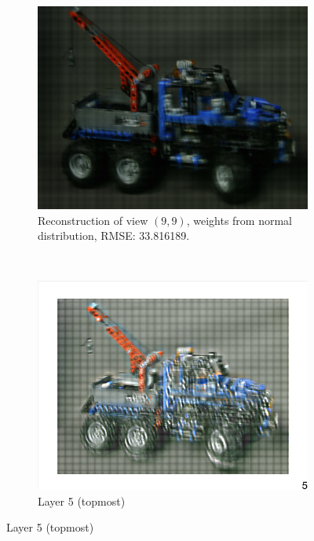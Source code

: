 \documentclass[11pt,a4paper,titlepage]{article}
\begin{document}
\begin{figure}
	\centering
	\begin{subfigure}[t]{0.45\textwidth}
		\includegraphics[width=\textwidth]{results/aliasing_fixes/interpolation_on_sensor/legotruck_w=gauss/Reconstruction of view (9, 9).png} 
  		\caption{Reconstruction of view $\left(9, 9\right)$, weights from normal distribution, RMSE: 33.816189.}
	\end{subfigure}%
	~
	\begin{subfigure}[t]{0.45\textwidth}
		\includegraphics[width=\textwidth]{results/aliasing_fixes/interpolation_on_sensor/legotruck_w=gauss/5.png} 
		\caption{Layer 5 (topmost)}
	\end{subfigure}%

\end{figure}
\end{document}
